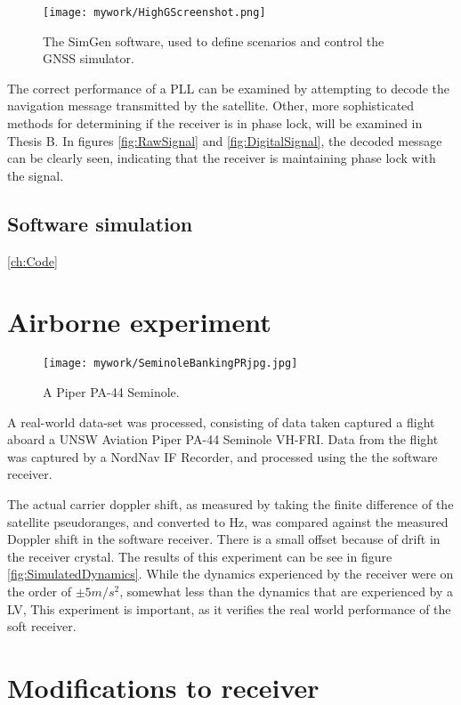 \begin{figure}[!htb] 
    \centering
    \texttt{[image: mywork/HighGScreenshot.png]} 
    \caption{The SimGen software, used to define scenarios and control the \ac{GNSS} simulator.}
    \label{:HighGScreenshot}
\end{figure}


The correct performance of a \ac{PLL} can be examined by attempting to decode the navigation message transmitted by the satellite. Other, more sophisticated methods for determining if the  receiver is in phase lock, will be examined in Thesis B. In figures \ref{fig:RawSignal} and \ref{fig:DigitalSignal}, the decoded message can be clearly seen, indicating that the receiver is maintaining phase lock with the signal.

\subsection{Software simulation}
\ref{ch:Code}

\section{Airborne experiment}

\begin{figure}[!htb] 
    \centering
    \texttt{[image: mywork/SeminoleBankingPRjpg.jpg]} 
    \caption{A Piper PA-44 Seminole.}
    \label{fig:PiperSeminole}
\end{figure}

A real-world data-set was processed, consisting of data taken captured a flight aboard a UNSW Aviation Piper PA-44 Seminole VH-FRI. Data from the flight was captured by a NordNav IF Recorder, and processed using the the software receiver. 

The actual carrier doppler shift, as measured by taking the finite difference of the satellite pseudoranges, and converted to Hz, was compared against the measured Doppler shift in the software receiver. There is a small offset because of drift in the receiver crystal. The results of this experiment can be see in figure \ref{fig:SimulatedDynamics}. While the dynamics experienced by the receiver were on the order of $\pm 5m/s^2$, somewhat less than the dynamics that are experienced by a \ac{LV}, This experiment is important, as it verifies the real world performance of the soft receiver. 

\section{Modifications to receiver}

